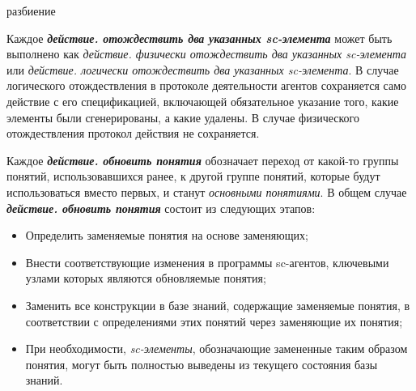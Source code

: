 \begin{SCn}
\begin{scnindent}
\begin{scnindent}
\end{scnindent}
\end{scnindent}

\begin{scnrelfromset}{разбиение}
\end{scnrelfromset}
\end{SCn}

Каждое \textbf{\textit{действие. отождествить два указанных sc-элемента}} может быть выполнено как \textit{действие. физически отождествить два указанных sc-элемента} или \textit{действие. логически отождествить два указанных sc-элемента}. В случае логического отождествления в протоколе деятельности агентов сохраняется само действие с его спецификацией, включающей обязательное указание того, какие элементы были сгенерированы, а какие удалены. В случае физического отождествления протокол действия не сохраняется.

Каждое \textbf{\textit{действие. обновить понятия}} обозначает переход от какой-то группы понятий, использовавшихся ранее, к другой группе понятий, которые будут использоваться вместо первых, и станут \textit{основными понятиями}.
В общем случае \textbf{\textit{действие. обновить понятия}} состоит из следующих этапов:

\begin{itemize}
	\item Определить заменяемые понятия на основе заменяющих;
	\item Внести соответствующие изменения в программы sc-агентов, ключевыми узлами которых являются обновляемые понятия;
	\item Заменить все конструкции в базе знаний, содержащие заменяемые понятия, в соответствии с определениями этих понятий через заменяющие их понятия;
	\item При необходимости,\textit{ sc-элементы}, обозначающие замененные таким образом понятия, могут быть полностью выведены из текущего состояния базы знаний.
\end{itemize}

